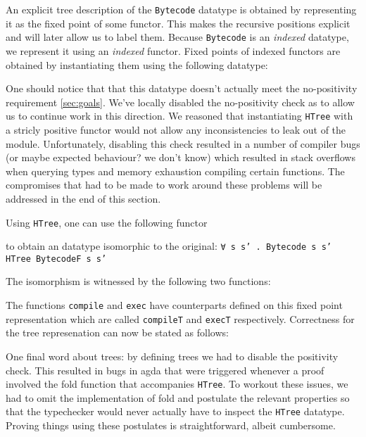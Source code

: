 \documentclass[a4paper]{article}
\begin{document}
        An explicit tree description of the \texttt{Bytecode} datatype is obtained by representing it as the fixed point of 
        some functor. This makes the recursive positions explicit and will later allow us to label them. Because \texttt{Bytecode} 
        is an \emph{indexed} datatype, we represent it using an \emph{indexed} functor. Fixed points of indexed functors are obtained 
        by instantiating them using the following datatype:
        
        
        
        One should notice that that this datatype doesn't actually meet the no-positivity requirement \ref{sec:goals}. We've locally disabled the 
        no-positivity check as to allow us to continue work in this direction. We reasoned that instantiating \texttt{HTree} with a stricly 
        positive functor would not allow any inconsistencies to leak out of the module. Unfortunately, disabling this check resulted in a number
        of compiler bugs (or maybe expected behaviour? we don't know) which resulted in stack overflows when querying types and memory exhaustion
        compiling certain functions. The compromises that had to be made to work around these problems will be addressed in the end of this section.
        
        Using \texttt{HTree}, one can use the following functor
        
 
        to obtain an datatype isomorphic to the original: \texttt{∀ s s' . Bytecode s s' ~ HTree BytecodeF s s'}
        
        The isomorphism is witnessed by the following two functions:
        
        
        The functions \texttt{compile} and \texttt{exec} have counterparts defined on this fixed point representation 
        which are called \texttt{compileT} and \texttt{execT} respectively. Correctness for the tree represenation can now be stated as follows:
        
        
        
        
        
        One final word about trees: by defining trees we had to disable the positivity check. This resulted in bugs in agda that were triggered 
        whenever a proof involved the fold function that accompanies \texttt{HTree}. To workout these issues, we had to omit the implementation of fold
        and postulate the relevant properties so that the typechecker would never actually have to inspect the \texttt{HTree} datatype. Proving things using
        these postulates is straightforward, albeit cumbersome.  
        
\end{document}
